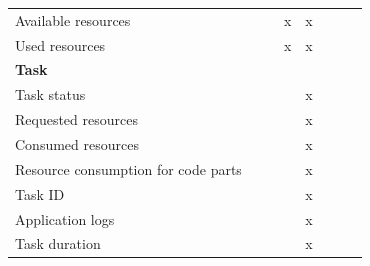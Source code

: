 \begin{table}[htbp]
{\begin{tabular}{lccccccc}
            Available resources                 &                   &                               & x                        & x                   &                         &                           &                           \\
            Used resources                      &                   &                               & x                        & x                   &                         &                           &                           \\
            \midrule
            \multicolumn{8}{l}{\textbf{Task}}                                                                                                                                                                                          \\[3pt]
            Task status                         &                   &                               &                          & x                   &                         &                           &                           \\
            Requested resources                 &                   &                               &                          & x                   &                         &                           &                           \\
            Consumed resources                  &                   &                               &                          & x                   &                         &                           &                           \\
            Resource consumption for code parts &                   &                               &                          & x                   &                         &                           &                           \\
            Task ID                             &                   &                               &                          & x                   &                         &                           &                           \\
            Application logs                    &                   &                               &                          & x                   &                         &                           &                           \\
            Task duration                       &                   &                               &                          & x                   &                         &                           &                           \\

\end{tabular}}
\end{table}
